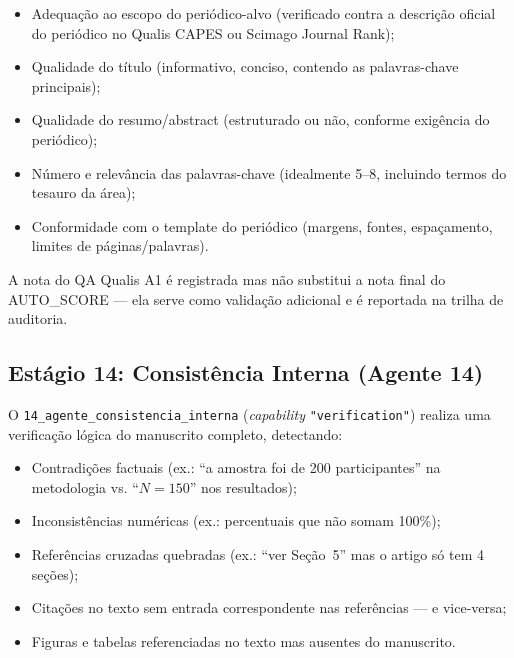 \begin{itemize}
    \item Adequação ao escopo do periódico-alvo (verificado contra
    a descrição oficial do periódico no Qualis CAPES ou Scimago
    Journal Rank);

    \item Qualidade do título (informativo, conciso, contendo as
    palavras-chave principais);

    \item Qualidade do resumo/abstract (estruturado ou não,
    conforme exigência do periódico);

    \item Número e relevância das palavras-chave (idealmente 5--8,
    incluindo termos do tesauro da área);

    \item Conformidade com o template do periódico (margens, fontes,
    espaçamento, limites de páginas/palavras).
\end{itemize}

A nota do QA Qualis A1 é registrada mas não substitui a nota final
do AUTO\_SCORE — ela serve como validação adicional e é reportada
na trilha de auditoria.

\subsection{Estágio 14: Consistência Interna (Agente 14)}
\label{sec:estagio14}

O \texttt{14\_agente\_consistencia\_interna}
(\textit{capability} \texttt{"verification"}) realiza uma
verificação lógica do manuscrito completo, detectando:

\begin{itemize}
    \item Contradições factuais (ex.: ``a amostra foi de 200
    participantes'' na metodologia vs. ``$N = 150$'' nos
    resultados);

    \item Inconsistências numéricas (ex.: percentuais que não somam
    100\%);

    \item Referências cruzadas quebradas (ex.: ``ver Seção~5'' mas
    o artigo só tem 4 seções);

    \item Citações no texto sem entrada correspondente nas
    referências — e vice-versa;

    \item Figuras e tabelas referenciadas no texto mas ausentes do
    manuscrito.
\end{itemize}

